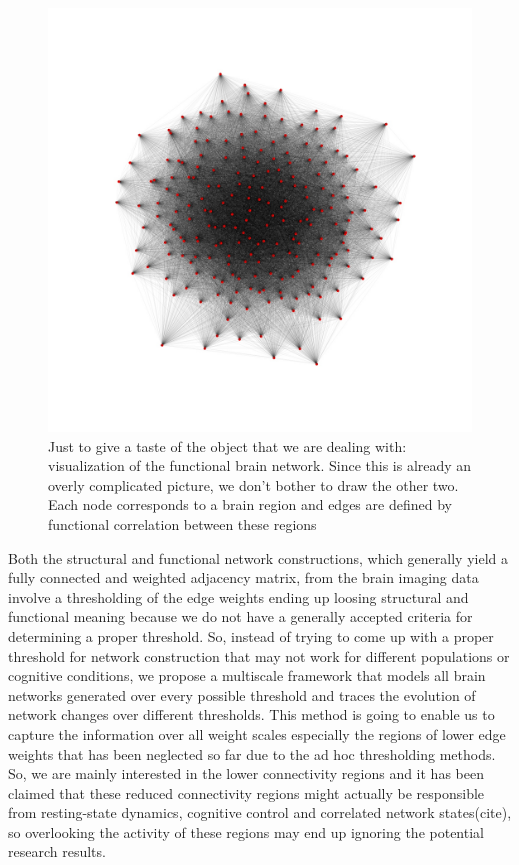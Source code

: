 \documentclass[9pt,twocolumn,twoside,lineno]{pnas-new}
\begin{document}
\begin{figure}%
\centering
\includegraphics[width=.8\linewidth]{spring.jpg}
\caption{Just to give a taste of the object that we are dealing with: visualization of the functional brain network. Since this is already an overly complicated picture, we don't bother to draw the other two. Each node corresponds to a brain region and edges are defined by functional correlation between  these regions}
\label{fig:network}
\end{figure}

Both the structural and functional network constructions, which generally yield a fully connected and weighted adjacency matrix, from the brain imaging data involve a thresholding of the edge weights ending up loosing structural and functional meaning because we do not have a generally accepted criteria for determining a proper threshold. So, instead of trying to come up with a proper threshold for network construction that may not work for different populations or cognitive conditions, we propose a multiscale framework that models all brain networks generated over every possible threshold and traces the evolution of network changes over different thresholds. This method is going to enable us to capture the information over all weight scales especially the regions of lower edge weights that has been neglected so far due to the ad hoc thresholding methods. So, we are mainly interested in the lower connectivity regions and it has been claimed that these reduced connectivity regions might actually be responsible from resting-state dynamics, cognitive control and correlated network states(cite), so overlooking the activity of these regions may end up ignoring the potential research results.
\end{document}

